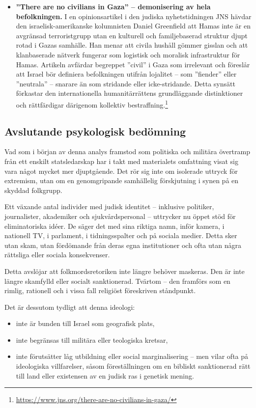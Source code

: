 \documentclass[12pt]{article}
\begin{document}
\begin{itemize}
\item \textbf{”There are no civilians in Gaza” – demonisering av hela befolkningen.} I en opinionsartikel i den judiska nyhetstidningen JNS hävdar den israelisk-amerikanske kolumnisten Daniel Greenfield att Hamas inte är en avgränsad terroristgrupp utan en kulturell och familjebaserad struktur djupt rotad i Gazas samhälle. Han menar att civila hushåll gömmer gisslan och att klanbaserade nätverk fungerar som logistisk och moralisk infrastruktur för Hamas. Artikeln avfärdar begreppet ”civil” i Gaza som irrelevant och föreslår att Israel bör definiera befolkningen utifrån lojalitet – som ”fiender” eller ”neutrala” – snarare än som stridande eller icke-stridande. Detta synsätt förkastar den internationella humanitärrättens grundläggande distinktioner och rättfärdigar därigenom kollektiv bestraffning.\footnote{\url{https://www.jns.org/there-are-no-civilians-in-gaza/}}


\end{itemize}


\subsection{Avslutande psykologisk bedömning}

Vad som i början av denna analys framstod som politiska och militära övertramp från ett enskilt statsledarskap har i takt med materialets omfattning visat sig vara något mycket mer djuptgående. Det rör sig inte om isolerade uttryck för extremism, utan om en genomgripande samhällelig förskjutning i synen på en skyddad folkgrupp. 

Ett växande antal individer med judisk identitet – inklusive politiker, journalister, akademiker och sjukvårdspersonal – uttrycker nu öppet stöd för eliminatoriska idéer. De säger det med sina riktiga namn, inför kamera, i nationell TV, i parlament, i tidningsspalter och på sociala medier. Detta sker utan skam, utan fördömande från deras egna institutioner och ofta utan några rättsliga eller sociala konsekvenser.

Detta avslöjar att folkmordsretoriken inte längre behöver maskeras. Den är inte längre skamfylld eller socialt sanktionerad. Tvärtom – den framförs som en rimlig, rationell och i vissa fall religiöst föreskriven ståndpunkt.


Det är dessutom tydligt att denna ideologi:
\begin{itemize}
    \item inte är bunden till Israel som geografisk plats,
    \item inte begränsas till militära eller teologiska kretsar,
    \item inte förutsätter låg utbildning eller social marginalisering – men vilar ofta på ideologiska villfarelser, såsom föreställningen om en bibliskt sanktionerad rätt till land eller existensen av en judisk ras i genetisk mening.
\end{itemize}
\end{document}
